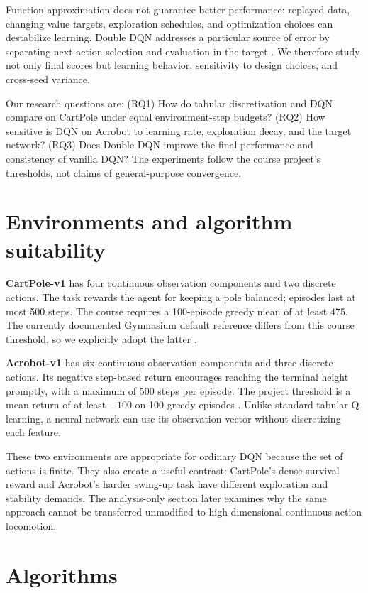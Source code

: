 \documentclass[a4paper,10pt,twocolumn]{article}
\begin{document}
Function approximation does not guarantee better performance: replayed data, changing value targets, exploration schedules, and optimization choices can destabilize learning. Double DQN addresses a particular source of error by separating next-action selection and evaluation in the target \cite{vanhasselt2016}. We therefore study not only final scores but learning behavior, sensitivity to design choices, and cross-seed variance.

Our research questions are: (RQ1) How do tabular discretization and DQN compare on CartPole under equal environment-step budgets? (RQ2) How sensitive is DQN on Acrobot to learning rate, exploration decay, and the target network? (RQ3) Does Double DQN improve the final performance and consistency of vanilla DQN? The experiments follow the course project's thresholds, not claims of general-purpose convergence.

\section{Environments and algorithm suitability}
\textbf{CartPole-v1} has four continuous observation components and two discrete actions. The task rewards the agent for keeping a pole balanced; episodes last at most 500 steps. The course requires a 100-episode greedy mean of at least 475. The currently documented Gymnasium default reference differs from this course threshold, so we explicitly adopt the latter \cite{gymcart}.

\textbf{Acrobot-v1} has six continuous observation components and three discrete actions. Its negative step-based return encourages reaching the terminal height promptly, with a maximum of 500 steps per episode. The project threshold is a mean return of at least $-100$ on 100 greedy episodes \cite{gymacro}. Unlike standard tabular Q-learning, a neural network can use its observation vector without discretizing each feature.

These two environments are appropriate for ordinary DQN because the set of actions is finite. They also create a useful contrast: CartPole's dense survival reward and Acrobot's harder swing-up task have different exploration and stability demands. The analysis-only section later examines why the same approach cannot be transferred unmodified to high-dimensional continuous-action locomotion.

\section{Algorithms}
\end{document}
